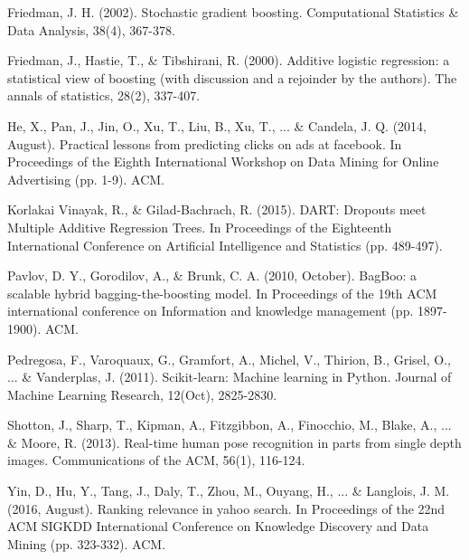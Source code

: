 \begin{thebibliography}{99}
Friedman, J. H. (2002). Stochastic gradient boosting. Computational Statistics \& Data Analysis, 38(4), 367-378.

Friedman, J., Hastie, T., \& Tibshirani, R. (2000). Additive logistic regression: a statistical view of boosting (with discussion and a rejoinder by the authors). The annals of statistics, 28(2), 337-407.

He, X., Pan, J., Jin, O., Xu, T., Liu, B., Xu, T., ... \& Candela, J. Q. (2014, August). Practical lessons from predicting clicks on ads at facebook. In Proceedings of the Eighth International Workshop on Data Mining for Online Advertising (pp. 1-9). ACM.

Korlakai Vinayak, R., \& Gilad-Bachrach, R. (2015). DART: Dropouts meet Multiple Additive Regression Trees. In Proceedings of the Eighteenth International Conference on Artificial Intelligence and Statistics (pp. 489-497).

Pavlov, D. Y., Gorodilov, A., \& Brunk, C. A. (2010, October). BagBoo: a scalable hybrid bagging-the-boosting model. In Proceedings of the 19th ACM international conference on Information and knowledge management (pp. 1897-1900). ACM.

Pedregosa, F., Varoquaux, G., Gramfort, A., Michel, V., Thirion, B., Grisel, O., ... \& Vanderplas, J. (2011). Scikit-learn: Machine learning in Python. Journal of Machine Learning Research, 12(Oct), 2825-2830.

Shotton, J., Sharp, T., Kipman, A., Fitzgibbon, A., Finocchio, M., Blake, A., ... \& Moore, R. (2013). Real-time human pose recognition in parts from single depth images. Communications of the ACM, 56(1), 116-124.

Yin, D., Hu, Y., Tang, J., Daly, T., Zhou, M., Ouyang, H., ... \& Langlois, J. M. (2016, August). Ranking relevance in yahoo search. In Proceedings of the 22nd ACM SIGKDD International Conference on Knowledge Discovery and Data Mining (pp. 323-332). ACM.
\end{thebibliography}

